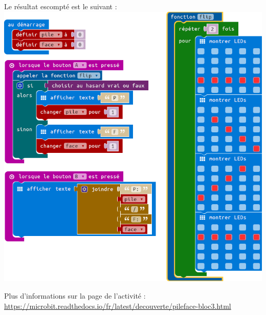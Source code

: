 \begin{methode}
Le résultat escompté est le suivant :\\
\includegraphics[width=\linewidth]{res/mbPilefaceN3proposition.png}
\end{methode}

\begin{remarque}
Plus d'informations sur la page de l'activité :\\ \url{https://microbit.readthedocs.io/fr/latest/decouverte/pileface-bloc3.html}
\end{remarque}


